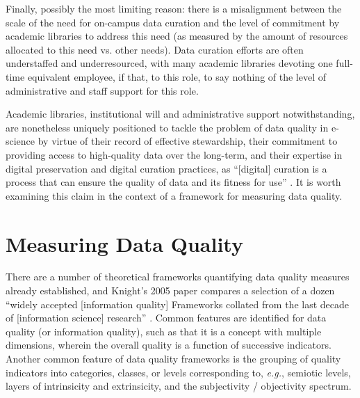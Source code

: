 \documentclass[man,12pt,biblatex]{apa6}
\let\footnote=\endnote
\begin{document}
Finally, possibly the most limiting reason: there is a misalignment
between the scale of the need for on-campus data curation and the
level of commitment by academic libraries to address this need (as
measured by the amount of resources allocated to this need vs. other
needs). Data curation efforts are often understaffed and
underresourced, with many academic libraries devoting one full-time
equivalent employee, if that, to this role, to say nothing of the
level of administrative and staff support for this role.

Academic libraries, institutional will and administrative support
notwithstanding, are nonetheless uniquely positioned to tackle the
problem of data quality in e-science by virtue of their record of
effective stewardship, their commitment to providing access to
high-quality data over the long-term, and their expertise in digital
preservation and digital curation practices, as ``[digital] curation
is a process that can ensure the quality of data and its fitness for
use'' \parencite{curry:community}. It is worth examining this claim in the
context of a framework for measuring data quality.

%
%

\section{Measuring Data Quality}
There are a number of theoretical frameworks quantifying data quality
measures already established, and Knight's 2005 paper compares a
selection of a dozen ``widely accepted [information quality]
Frameworks collated from the last decade of [information science]
research'' \parencite{knight:quality}. Common features are identified for
data quality (or information quality), such as that it is a concept
with multiple dimensions, wherein the overall quality is a function of
successive indicators.  Another common feature of data quality
frameworks is the grouping of quality indicators into categories,
classes, or levels corresponding to, \textit{e.g.}, semiotic levels,
layers of intrinsicity and extrinsicity, and the subjectivity /
objectivity spectrum.
\end{document}

